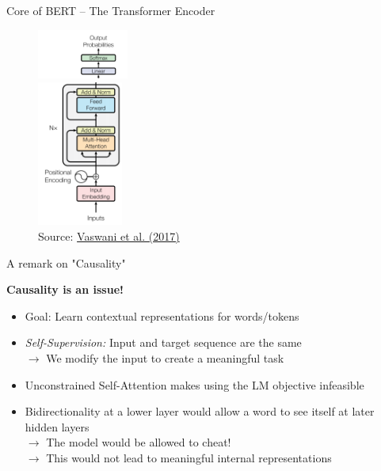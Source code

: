
\begin{vbframe}{Core of BERT -- The Transformer Encoder}

\begin{figure}
	\centering
		\includegraphics[width = 3cm]{figure/bert-top.png}\\ 
		\includegraphics[width = 2.8cm]{figure/bert-bottom.png}\\ 
	\footnotesize{Source:} \href{https://arxiv.org/pdf/1706.03762.pdf}{Vaswani et al. (2017)}
\end{figure}

\end{vbframe}


\begin{vbframe}{A remark on "Causality"}

\vfill

\textbf{Causality is an issue!}
	
\begin{itemize}
	\item Goal: Learn contextual representations for words/tokens
	\item \textit{Self-Supervision:} Input and target sequence are the same\\
				$\rightarrow$ We modify the input to create a meaningful task 
	\item Unconstrained Self-Attention makes using the LM objective infeasible
	\item Bidirectionality at a lower layer would allow a word to see itself at later hidden layers\\
				$\rightarrow$ The model would be allowed to cheat!\\
				$\rightarrow$ This would not lead to meaningful internal representations
\end{itemize}

\vfill

\end{vbframe}

